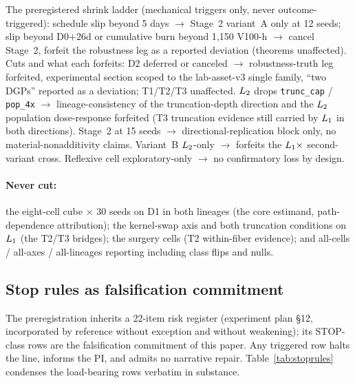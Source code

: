The preregistered shrink ladder (mechanical triggers only, never
outcome-triggered): schedule slip beyond 5 days $\to$ Stage~2 variant~A only
at 12 seeds; slip beyond D0$+26$d or cumulative burn beyond 1{,}150 V100-h
$\to$ cancel Stage~2, forfeit the robustness leg as a reported deviation
(theorems unaffected). Cuts and what each forfeits: D2 deferred or canceled
$\to$ robustness-truth leg forfeited, experimental section scoped to the
lab-asset-v3 single family, ``two DGPs'' reported as a deviation; T1/T2/T3
unaffected. $L_{2}$ drops \texttt{trunc\_cap} / \texttt{pop\_4x} $\to$
lineage-consistency of the truncation-depth direction and the $L_{2}$
population dose-response forfeited (T3 truncation evidence still carried by
$L_{1}$ in both directions). Stage~2 at 15 seeds $\to$ directional-replication
block only, no material-nonadditivity claims. Variant~B $L_{2}$-only $\to$
forfeits the $L_{1} \times$ second-variant cross. Reflexive cell
exploratory-only $\to$ no confirmatory loss by design.

\paragraph{Never cut:} the eight-cell cube $\times$ 30 seeds on D1 in both
lineages (the core estimand, path-dependence attribution); the kernel-swap
axis and both truncation conditions on $L_{1}$ (the T2/T3 bridges); the
surgery cells (T2 within-fiber evidence); and all-cells / all-axes /
all-lineages reporting including class flips and nulls.

\subsection{Stop rules as falsification commitment}
\label{sec:scope-stop}

The preregistration inherits a 22-item risk register (experiment plan \S12,
incorporated by reference without exception and without weakening); its
STOP-class rows are the falsification commitment of this paper. Any triggered
row halts the line, informs the PI, and admits no narrative repair.
Table~\ref{tab:stoprules} condenses the load-bearing rows verbatim in
substance.

